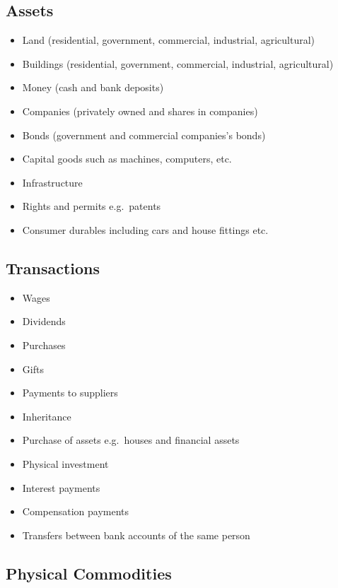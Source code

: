 \documentclass[]{tufte-handout}
\providecommand{\tightlist}{%
  \setlength{\itemsep}{0pt}\setlength{\parskip}{0pt}}
\begin{document}
\hypertarget{assets}{%
\subsection{Assets}\label{assets}}

\begin{itemize}
\tightlist
\item
  Land (residential, government, commercial, industrial, agricultural)
\item
  Buildings (residential, government, commercial, industrial,
  agricultural)
\item
  Money (cash and bank deposits)
\item
  Companies (privately owned and shares in companies)
\item
  Bonds (government and commercial companies's bonds)
\item
  Capital goods such as machines, computers, etc.
\item
  Infrastructure
\item
  Rights and permits e.g.~patents
\item
  Consumer durables including cars and house fittings etc.
\end{itemize}

\hypertarget{transactions}{%
\subsection{Transactions}\label{transactions}}

\begin{itemize}
\tightlist
\item
  Wages
\item
  Dividends
\item
  Purchases
\item
  Gifts
\item
  Payments to suppliers
\item
  Inheritance
\item
  Purchase of assets e.g.~houses and financial assets
\item
  Physical investment
\item
  Interest payments
\item
  Compensation payments
\item
  Transfers between bank accounts of the same person
\end{itemize}

\hypertarget{physical-commodities}{%
\subsection{Physical Commodities}\label{physical-commodities}}
\end{document}
